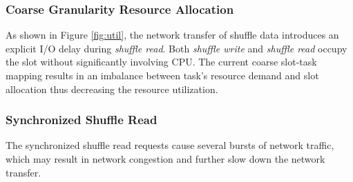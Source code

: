 \subsubsection{Coarse Granularity Resource Allocation}
{\color{blue}
As shown in Figure \ref{fig:util}, the network transfer of shuffle data introduces an explicit I/O delay during \textit{shuffle read}.
Both \textit{shuffle write} and \textit{shuffle read} occupy the slot without significantly involving CPU.
The current coarse slot-task mapping results in an imbalance between task's resource demand and slot allocation thus decreasing the resource utilization. 


\subsubsection{Synchronized Shuffle Read}

The synchronized shuffle read requests cause several bursts of network traffic, which may result in network congestion and further slow down the network transfer.


}
